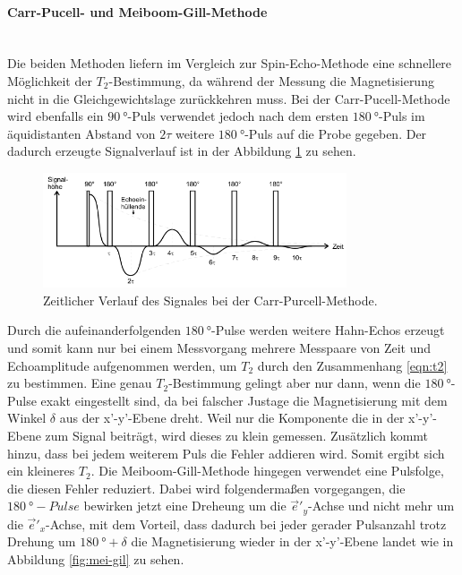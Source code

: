 \paragraph{Carr-Pucell- und Meiboom-Gill-Methode}\\
Die beiden Methoden liefern im Vergleich zur Spin-Echo-Methode eine
schnellere Möglichkeit der $T_2$-Bestimmung, da während der Messung die Magnetisierung
nicht in die Gleichgewichtslage zurückkehren muss.
Bei der Carr-Pucell-Methode wird ebenfalls ein $\SI{90}{\degree}$-Puls
verwendet jedoch nach dem ersten $\SI{180}{\degree}$-Puls
im äquidistanten Abstand von $2\tau$ weitere $\SI{180}{\degree}$-Puls
auf die Probe gegeben. Der dadurch erzeugte Signalverlauf
ist in der Abbildung \ref{fig:carr-pu} zu sehen.
\begin{figure}
  \centering
  \includegraphics[width=0.8\textwidth]{carr-pu.PNG}
  \caption{Zeitlicher Verlauf des Signales bei der Carr-Purcell-Methode.\cite{sample}}
  \label{fig:carr-pu}
\end{figure}
Durch die aufeinanderfolgenden $\SI{180}{\degree}$-Pulse werden
weitere Hahn-Echos erzeugt und
somit kann nur bei einem Messvorgang mehrere Messpaare von Zeit und
Echoamplitude aufgenommen werden, um $T_2$ durch den Zusammenhang \eqref{eqn:t2} zu bestimmen.
Eine genau $T_2$-Bestimmung gelingt aber nur dann,
wenn die $\SI{180}{\degree}$-Pulse exakt eingestellt sind, da
bei falscher Justage die Magnetisierung mit dem Winkel $\delta$ aus der x'-y'-Ebene
dreht. Weil nur die Komponente die in der x'-y'-Ebene zum Signal beiträgt,
wird dieses zu klein gemessen. Zusätzlich kommt hinzu, dass
bei jedem weiterem Puls die Fehler addieren wird.
Somit ergibt sich ein kleineres $T_2$.
Die Meiboom-Gill-Methode hingegen verwendet eine
Pulsfolge, die diesen Fehler reduziert. Dabei wird folgendermaßen
vorgegangen, die $\SI{180}{\degree}-Pulse$ bewirken
jetzt eine Dreheung um die $\vec{e}'_y$-Achse und nicht mehr
um die $\vec{e}'_x$-Achse, mit dem Vorteil, dass dadurch bei jeder
gerader Pulsanzahl trotz Drehung
um $\SI{180}{\degree}+\delta$ die Magnetisierung wieder in der x'-y'-Ebene
landet wie in Abbildung \ref{fig:mei-gil} zu sehen.
